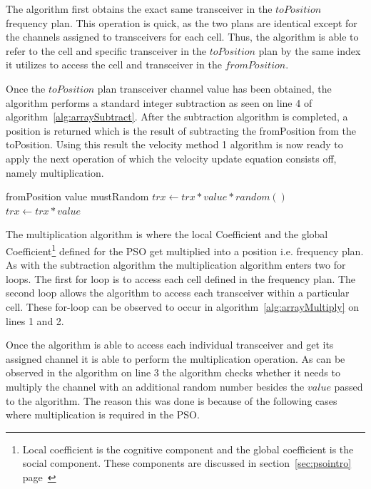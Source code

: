 The algorithm first obtains the exact same transceiver in the $toPosition$ frequency plan. This operation is quick, as the two plans are identical except for the channels assigned to transceivers for each cell. Thus, the algorithm is able to refer to the cell and specific transceiver in the $toPosition$ plan by the same index it utilizes to access the cell and transceiver in the $fromPosition$.

Once the $toPosition$ plan transceiver channel value has been obtained, the algorithm performs a standard integer subtraction as seen on line 4 of algorithm~\ref{alg:arraySubtract}.
After the subtraction algorithm is completed, a position is returned which is the result of subtracting the fromPosition from the toPosition. Using this result the velocity method 1 algorithm is now ready to apply the next operation of which the velocity update equation consists off, namely multiplication.

\begin{algorithm}
\caption{Multiply position with a value (Method 1)}
\label{alg:arrayMultiply}
\begin{algorithmic}[1]
	\REQUIRE fromPosition
	\REQUIRE value
	\REQUIRE mustRandom
				\STATE $trx \leftarrow trx * value * random()$
			\ELSE
				\STATE $trx \leftarrow trx * value$
			\ENDIF
		\ENDFOR
	\ENDFOR
\end{algorithmic}
\end{algorithm}

The multiplication algorithm is where the local Coefficient and the global Coefficient\footnote{Local coefficient is the cognitive component and the global coefficient is the social component. These components are discussed in section~\ref{sec:psointro} page~\pageref{def:socialcomponent}} defined for the PSO get multiplied into a position i.e. frequency plan. As with the subtraction algorithm the multiplication algorithm enters two for loops. The first for loop is to access each cell defined in the frequency plan. The second loop allows the algorithm to access each transceiver within a particular cell. These for-loop can be observed to occur in algorithm~\ref{alg:arrayMultiply} on lines 1 and 2.

Once the algorithm is able to access each individual transceiver and get its assigned channel it is able to perform the multiplication operation. As can be observed in the algorithm on line 3 the algorithm checks whether it needs to multiply the channel with an additional random number besides the $value$ passed to the algorithm. The reason this was done is because of the following cases where multiplication is required in the PSO.

